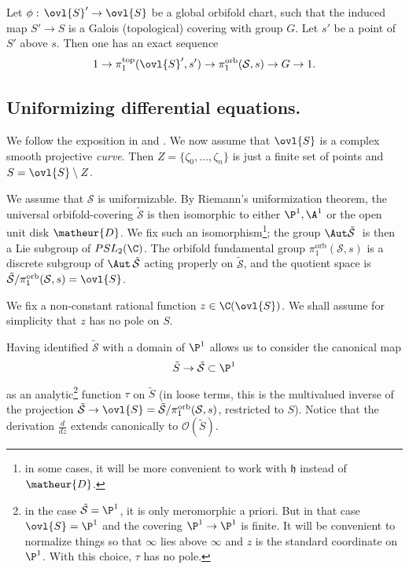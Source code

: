 \begin{para}\label{para::4.2.3} Let $\phi:\,\ovl{S}'\to \ovl{S}$ be a global orbifold chart, such that the induced map $S'\to S$ is a
Galois (topological) covering with group $G$. Let $s'$ be a point of $S'$ above $s$. Then one has an exact sequence
\begin{equation*}
1\to \pi_1^{\mathrm{top}}(\ovl{S}',s')\to \pi_1^{\mathrm{orb}}(\mathcal{S},s) \to G \to 1.
\end{equation*}



\end{para}

\subsection{Uniformizing differential equations.}\label{sub::4.3}

\begin{para}\label{para::4.3.1} We follow the exposition in \cite[4,
 5.2]{fde} and \cite[4]{aeoaafg}. We now assume that $\ovl{S}$ is a 
complex smooth projective {\it curve}. Then $Z=\{\zeta_0,\ldots
 ,\zeta_n\}$ is just a finite set of points and $S=\ovl{S}\setminus Z$.

 We assume that $\mathcal{S}$ is uniformizable. By Riemann's
 uniformization theorem, the universal orbifold-covering
 $\tilde{\mathcal{S}}$ is then isomorphic to either
 $\P^1, \A^1$ or the open unit disk $\matheur{D}$.  We fix such an
 isomorphism\footnote{in some cases, it will be more 
 convenient to work with $\mathfrak{h}$ instead of $\matheur{D}$.}; the
 group $\Aut 
 \tilde{\mathcal{S}}\;$ is then a Lie subgroup of $PSL_2(\C)$. The
 orbifold fundamental group $\pi_1^{\mathrm{orb}}(\mathcal{S},s)$ is a discrete
 subgroup of $\Aut\, \tilde{\mathcal{S}}$ acting properly on
 $\tilde{\mathcal{S}}$, and the quotient space is
 $\tilde{\mathcal{S}}/\pi_1^{\mathrm{orb}}(\mathcal{S},s)=\ovl{S}$.      
\end{para}

\begin{para}\label{para::4.3.2} We fix a non-constant rational function $z\in
 \C(\ovl{S})$. We shall assume for simplicity that $z$ has no 
 pole on $S$. 

 \noindent Having identified $\tilde{\mathcal{S}}$ with a domain of
 $\P^1$ allows us to consider the canonical map 
 \begin{equation*}
  \tilde S\to \tilde{\mathcal{S}}\subset \P^1
 \end{equation*}
 as an analytic\footnote{in the case $\tilde{\mathcal{S}}=\P^1$,
 it is only meromorphic a priori. But in that case $\ovl{S}=\P^1$ and
 the covering $\P^1\to \P^1$ is finite. It will be convenient to
 normalize things so that $\infty$ lies above $\infty$ and $z$ is the
 standard coordinate on $\P^1$. With this choice, $\tau$ has no pole.} 
 function $\tau$ on $\tilde S$ (in loose terms, this is the multivalued
 inverse of the projection
 $\tilde{\mathcal{S}}\to
 \ovl{S}=\tilde{\mathcal{S}}/\pi_1^{\mathrm{orb}}(\mathcal{S},s)$,
 restricted to $S$). Notice that the derivation 
 $\frac{d}{dz}$ extends canonically to $\mathcal{O}(\tilde S)$. 
\end{para}

